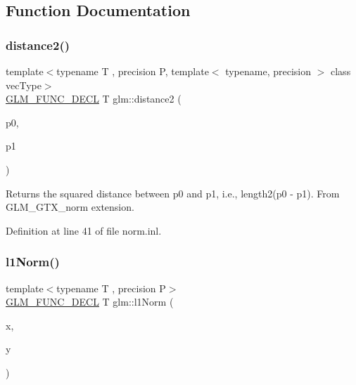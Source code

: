 \subsection{Function Documentation}
\mbox{\label{group__gtx__norm_ga647d2602008801d6ed78f9708eb439cc}} 
\subsubsection{\texorpdfstring{distance2()}{distance2()}}
{\footnotesize\ttfamily template$<$typename T , precision P, template$<$ typename, precision $>$ class vec\+Type$>$ \\
\mbox{\hyperlink{setup_8hpp_ab2d052de21a70539923e9bcbf6e83a51}{G\+L\+M\+\_\+\+F\+U\+N\+C\+\_\+\+D\+E\+CL}} T glm\+::distance2 (\begin{DoxyParamCaption}\item[{vec\+Type$<$ T, P $>$ const \&}]{p0,  }\item[{vec\+Type$<$ T, P $>$ const \&}]{p1 }\end{DoxyParamCaption})}

Returns the squared distance between p0 and p1, i.\+e., length2(p0 -\/ p1). From G\+L\+M\+\_\+\+G\+T\+X\+\_\+norm extension. 

Definition at line 41 of file norm.\+inl.

\mbox{\label{group__gtx__norm_gaebe5a39b06e262e615622129f37da4f4}} 
\subsubsection{\texorpdfstring{l1Norm()}{l1Norm()}\hspace{0.1cm}{\footnotesize\ttfamily [1/2]}}
{\footnotesize\ttfamily template$<$typename T , precision P$>$ \\
\mbox{\hyperlink{setup_8hpp_ab2d052de21a70539923e9bcbf6e83a51}{G\+L\+M\+\_\+\+F\+U\+N\+C\+\_\+\+D\+E\+CL}} T glm\+::l1\+Norm (\begin{DoxyParamCaption}\item[{\mbox{\hyperlink{structglm_1_1tvec3}{tvec3}}$<$ T, P $>$ const \&}]{x,  }\item[{\mbox{\hyperlink{structglm_1_1tvec3}{tvec3}}$<$ T, P $>$ const \&}]{y }\end{DoxyParamCaption})}

